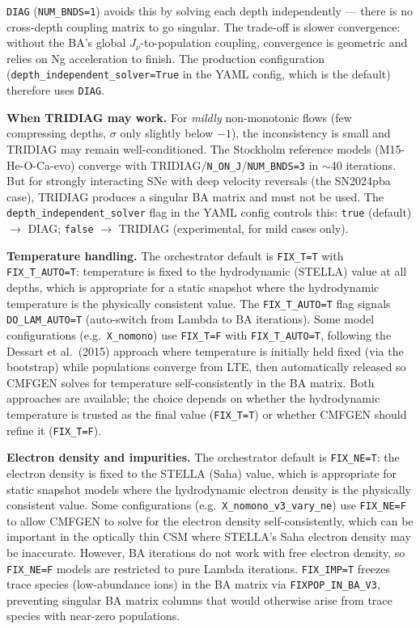 \documentclass[11pt]{article}
\begin{document}
\texttt{DIAG} (\texttt{NUM\_BNDS=1}) avoids this by solving each depth
independently --- there is no cross-depth coupling matrix to go singular.
The trade-off is slower convergence: without the BA's global
$J_\nu$-to-population coupling, convergence is geometric and relies on
Ng acceleration to finish.  The production configuration
(\texttt{depth\_independent\_solver=True} in the YAML config, which is
the default) therefore uses \texttt{DIAG}.

\textbf{When TRIDIAG may work.}\quad
For \emph{mildly} non-monotonic flows (few compressing depths,
$\sigma$ only slightly below $-1$), the inconsistency is small and
TRIDIAG may remain well-conditioned.  The Stockholm reference models
(M15-He-O-Ca-evo) converge with TRIDIAG/\texttt{N\_ON\_J}/\texttt{NUM\_BNDS=3}
in $\sim$40 iterations.  But for strongly interacting SNe with deep
velocity reversals (the SN2024pba case), TRIDIAG produces a singular BA
matrix and must not be used.  The \texttt{depth\_independent\_solver}
flag in the YAML config controls this: \texttt{true} (default) $\to$
DIAG; \texttt{false} $\to$ TRIDIAG (experimental, for mild cases only).

\textbf{Temperature handling.}\quad
The orchestrator default is \texttt{FIX\_T=T} with
\texttt{FIX\_T\_AUTO=T}: temperature is fixed to the hydrodynamic
(STELLA) value at all depths, which is appropriate for a static
snapshot where the hydrodynamic temperature is the physically
consistent value.  The \texttt{FIX\_T\_AUTO=T} flag signals
\texttt{DO\_LAM\_AUTO=T} (auto-switch from Lambda to BA iterations).
Some model configurations (e.g.\ \texttt{X\_nomono}) use
\texttt{FIX\_T=F} with \texttt{FIX\_T\_AUTO=T}, following the Dessart
et al.\ (2015) approach where temperature is initially held fixed
(via the bootstrap) while populations converge from LTE, then
automatically released so CMFGEN solves for temperature
self-consistently in the BA matrix.  Both approaches are available;
the choice depends on whether the hydrodynamic temperature is trusted
as the final value (\texttt{FIX\_T=T}) or whether CMFGEN should refine
it (\texttt{FIX\_T=F}).

\textbf{Electron density and impurities.}\quad
The orchestrator default is \texttt{FIX\_NE=T}: the electron density is
fixed to the STELLA (Saha) value, which is appropriate for static
snapshot models where the hydrodynamic electron density is the
physically consistent value.  Some configurations (e.g.\
\texttt{X\_nomono\_v3\_vary\_ne}) use \texttt{FIX\_NE=F} to allow
CMFGEN to solve for the electron density self-consistently, which can
be important in the optically thin CSM where STELLA's Saha electron
density may be inaccurate.  However, BA iterations do not work with
free electron density, so \texttt{FIX\_NE=F} models are restricted to
pure Lambda iterations.  \texttt{FIX\_IMP=T} freezes trace species
(low-abundance ions) in the BA matrix via \texttt{FIXPOP\_IN\_BA\_V3},
preventing singular BA matrix columns that would otherwise arise from
trace species with near-zero populations.
\end{document}
